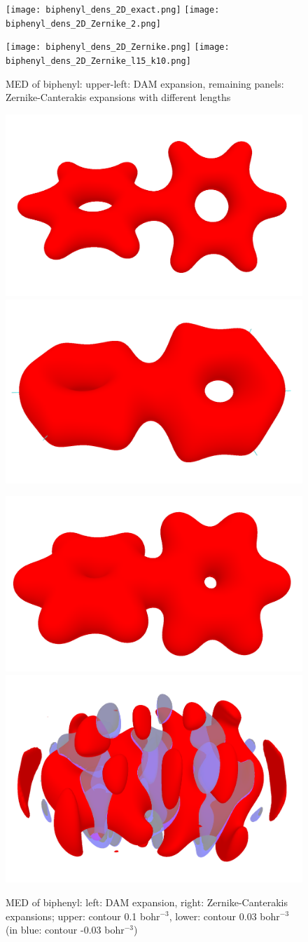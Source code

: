\documentclass[10pt]{article}
\begin{document}
\begin{figure}[H]
\begin{center}
\texttt{[image: biphenyl\_dens\_2D\_exact.png]}
\hspace*{5mm}
\texttt{[image: biphenyl\_dens\_2D\_Zernike\_2.png]}

\texttt{[image: biphenyl\_dens\_2D\_Zernike.png]}
\hspace*{5mm}
\texttt{[image: biphenyl\_dens\_2D\_Zernike\_l15\_k10.png]}
\end{center}
\caption[2D MED Zernike-Canterakis expansions of biphenyl]{ MED of biphenyl: upper-left: DAM expansion, remaining panels: Zernike-Canterakis expansions with different
lengths
\label{fig:6_9_1}}
\end{figure}


\begin{figure}[H]
\begin{center}
\includegraphics[width=.35\linewidth]{biphenyl_dens_3D_exact_0p1.png}
\hspace*{5mm}
\includegraphics[width=.35\linewidth]{biphenyl_dens_3D_Zernike_0p1.png}

\includegraphics[width=.35\linewidth]{biphenyl_dens_3D_exact_0p03.png}
\hspace*{5mm}
\includegraphics[width=.35\linewidth]{biphenyl_dens_3D_Zernike_0p03.png}
\end{center}
\caption[3D MED Zernike-Canterakis expansions of biphenyl]{ MED of biphenyl: left: DAM expansion, right: Zernike-Canterakis expansions;
upper: contour 0.1 bohr$^{-3}$, lower: contour 0.03 bohr$^{-3}$ (in blue: contour -0.03 bohr$^{-3}$)
\label{fig:6_9_2}}
\end{figure}
\end{document}
